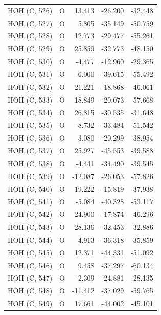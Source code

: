 \begin{longtable}{@{}lcrr@{}}
  \cmidrule(r){1-5}
  HOH (C, 526) & O & 13.413 & -26.200 & -32.448 \\
  \cmidrule(r){1-5}
  HOH (C, 527) & O & 5.805 & -35.149 & -50.759 \\
  \cmidrule(r){1-5}
  HOH (C, 528) & O & 12.773 & -29.477 & -55.261 \\
  \cmidrule(r){1-5}
  HOH (C, 529) & O & 25.859 & -32.773 & -48.150 \\
  \cmidrule(r){1-5}
  HOH (C, 530) & O & -4.477 & -12.960 & -29.365 \\
  \cmidrule(r){1-5}
  HOH (C, 531) & O & -6.000 & -39.615 & -55.492 \\
  \cmidrule(r){1-5}
  HOH (C, 532) & O & 21.221 & -18.868 & -46.061 \\
  \cmidrule(r){1-5}
  HOH (C, 533) & O & 18.849 & -20.073 & -57.668 \\
  \cmidrule(r){1-5}
  HOH (C, 534) & O & 26.815 & -30.535 & -31.648 \\
  \cmidrule(r){1-5}
  HOH (C, 535) & O & -8.732 & -33.484 & -51.542 \\
  \cmidrule(r){1-5}
  HOH (C, 536) & O & 3.080 & -20.299 & -38.954 \\
  \cmidrule(r){1-5}
  HOH (C, 537) & O & 25.927 & -45.553 & -39.588 \\
  \cmidrule(r){1-5}
  HOH (C, 538) & O & -4.441 & -34.490 & -39.545 \\
  \cmidrule(r){1-5}
  HOH (C, 539) & O & -12.087 & -26.053 & -57.826 \\
  \cmidrule(r){1-5}
  HOH (C, 540) & O & 19.222 & -15.819 & -37.938 \\
  \cmidrule(r){1-5}
  HOH (C, 541) & O & -5.084 & -40.328 & -53.117 \\
  \cmidrule(r){1-5}
  HOH (C, 542) & O & 24.900 & -17.874 & -46.296 \\
  \cmidrule(r){1-5}
  HOH (C, 543) & O & 28.136 & -32.453 & -32.886 \\
  \cmidrule(r){1-5}
  HOH (C, 544) & O & 4.913 & -36.318 & -35.859 \\
  \cmidrule(r){1-5}
  HOH (C, 545) & O & 12.371 & -44.331 & -51.092 \\
  \cmidrule(r){1-5}
  HOH (C, 546) & O & 9.458 & -37.297 & -60.134 \\
  \cmidrule(r){1-5}
  HOH (C, 547) & O & -2.309 & -24.881 & -28.135 \\
  \cmidrule(r){1-5}
  HOH (C, 548) & O & -11.412 & -37.029 & -59.765 \\
  \cmidrule(r){1-5}
  HOH (C, 549) & O & 17.661 & -44.002 & -45.101 \\

\end{longtable}
